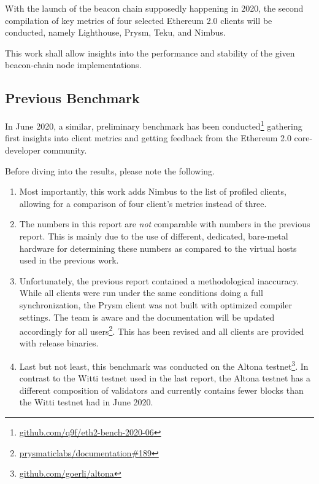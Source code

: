 \documentclass[twoside,twocolumn]{article}
\begin{document}
With the launch of the beacon chain supposedly happening in 2020, the second compilation of key metrics of four selected Ethereum 2.0 clients will be conducted, namely Lighthouse, Prysm, Teku, and Nimbus.\par

This work shall allow insights into the performance and stability of the given beacon-chain node implementations.\par

\subsection{Previous Benchmark}
In June 2020, a similar, preliminary benchmark has been conducted\footnote{\href{https://github.com/q9f/eth2-bench-2020-06}{github.com/q9f/eth2-bench-2020-06}} gathering first insights into client metrics and getting feedback from the Ethereum 2.0 core-developer community.\par

Before diving into the results, please note the following.

\begin{enumerate}
\item Most importantly, this work adds Nimbus to the list of profiled clients, allowing for a comparison of four client's metrics instead of three.
\item The numbers in this report are \textit{not} comparable with numbers in the previous report. This is mainly due to the use of different, dedicated, bare-metal hardware for determining these numbers as compared to the virtual hosts used in the previous work.
\item Unfortunately, the previous report contained a methodological inaccuracy. While all clients were run under the same conditions doing a full synchronization, the Prysm client was not built with optimized compiler settings. The team is aware and the documentation will be updated accordingly for all users\footnote{\href{https://github.com/prysmaticlabs/documentation/issues/189}{prysmaticlabs/documentation\#189}}. This has been revised and all clients are provided with release binaries.
\item Last but not least, this benchmark was conducted on the Altona testnet\footnote{\href{https://github.com/goerli/altona}{github.com/goerli/altona}}. In contrast to the Witti testnet used in the last report, the Altona testnet has a different composition of validators and currently contains fewer blocks than the Witti testnet had in June 2020.
\end{enumerate}
\end{document}

